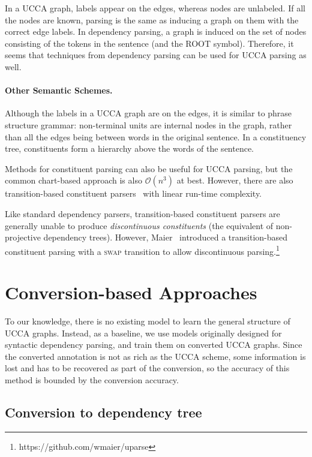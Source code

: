 \documentclass[11pt]{article}
\begin{document}
In a UCCA graph, labels appear on the edges, whereas nodes are unlabeled. If all the nodes are known, parsing is the same as inducing a graph on them with the correct edge labels. In dependency parsing, a graph is induced on the set of nodes consisting of the tokens in the sentence (and the \textsc{ROOT} symbol). Therefore, it seems that techniques from dependency parsing can be used for UCCA parsing as well.

\paragraph{Other Semantic Schemes.}

Although the labels in a UCCA graph are on the edges, it is similar to phrase structure grammar: non-terminal units are internal nodes in the graph, rather than all the edges being between words in the original sentence. In a constituency tree, constituents form a hierarchy above the words of the sentence.

Methods for constituent parsing can also be useful for UCCA parsing, but the common chart-based approach is also $\mathcal{O}(n^3)$ at best. However, there are also transition-based constituent parsers~\cite{zhu2013fast} with linear run-time complexity.

Like standard dependency parsers, transition-based constituent parsers are generally unable to produce \textit{discontinuous constituents} (the equivalent of non-projective dependency trees). However, Maier~ introduced a transition-based constituent parsing with a \textsc{swap} transition to allow discontinuous parsing.\footnote{https://github.com/wmaier/uparse}


\section{Conversion-based Approaches}

To our knowledge, there is no existing model to learn the general structure of UCCA graphs. Instead, as a baseline, we use models originally designed for syntactic dependency parsing, and train them on converted UCCA graphs. Since the converted annotation is not as rich as the UCCA scheme, some information is lost and has to be recovered as part of the conversion, so the accuracy of this method is bounded by the conversion accuracy.

\subsection{Conversion to dependency tree}
\end{document}
